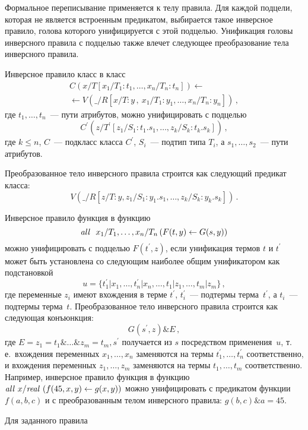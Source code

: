 \begin{multicols}{2}
     Формальное переписывание применяется к телу правила. Для каждой подцели,
которая не является встроенным предикатом, выбирается такое инверсное правило, голова
которого унифицируется с этой подцелью. Унификация головы инверсного правила с
подцелью также влечет следующее преобразование тела инверсного правила.

     Инверсное правило класс в класс
\begin{multline*}
C(x/T[x_1/T_1:t_1, \ldots , x_n/T_n:t_n])\leftarrow
{}\\
{}\leftarrow V(\_/R[x/T:y\,,\ x_1/T_1:y_1, \ldots ,
x_n/T_n:y_n])\,,
\end{multline*}
     где $t_1, \ldots, t_n$~--- пути атрибутов, можно унифицировать с подцелью
$$
C^\prime (z/T^\prime [z_1/S_1:t_1.s_1, \ldots , z_k/S_k:t_k.s_k])\,,
$$
     где $k\leq n$, $C$~--- подкласс класса $C^\prime$, $S_i$~--- подтип типа $T_i$, а
$s_1, \ldots , s_2$~--- пути атрибутов.

     Преобразованное тело инверсного правила строится как следующий предикат
класса:
$$
V(\_/R[z/T:y, z_1/S_1:y_1.s_1, \ldots , z_k/S_k:y_k.s_k])\,.
$$

     Инверсное правило функция в функцию
     $$
\mbox{\textit{all}\ \ } x_1/T_1, \ldots , x_n/T_n  \left ( F(t, y) \leftarrow G(s, y)\right )
$$
     можно унифицировать с подцелью
$F(t^\prime , z)$, если унификация термов $t$ и $t^\prime$
может быть установлена со следующим
наиболее общим унификатором как подстановкой
$$
u=\{ t^\prime_1\vert x_1, \ldots , t^\prime_n \vert x_n, \ldots , t_1\vert z_1, \ldots , t_m\vert z_m \}\,,
$$
     где переменные $z_i$ имеют вхождения в терме $t^\prime$, $t^\prime_i$~---
подтермы терма~$t^\prime$, а $t_i$~--- подтермы терма~$t$. Преобразованное тело
инверсного правила строится как следующая конъюнкция:
$$
G(s^\prime , z) \& E\,,
$$
     где $E = z_1=t_1 \& \ldots \& z_m=t_m, s^\prime$ получается из $s$ посредством
применения~$u$, т.\,е.\ вхождения переменных $x_1, \ldots, x_n$ заменяются на термы %
$t^\prime_1, \ldots , t^\prime_n$ соответственно, и вхождения переменных $z_1, \ldots , z_m$
заменяются на термы
 $t_1, \ldots , t_m$ соответственно. Например, инверсное правило
функция в функцию $\mbox{\textit{all}\  }x/\mbox{\textit{real}\ }( f(45, x, y) \leftarrow  g(x,y))$
можно унифицировать с предикатом функции %
 $f(a, b, c)$ и с преобразованным телом
инверсного правила: $g(b, c) \& a = 45$.

Для заданного правила


\end{multicols}

